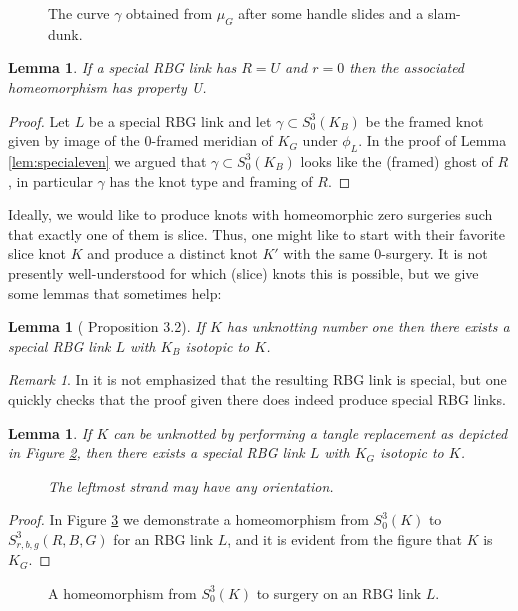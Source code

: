 \documentclass [11pt]{amsart}
\newtheorem {lemma}[theorem]{Lemma}
\theoremstyle{remark}
\newtheorem {remark}[theorem]{Remark}
\begin{document}
\begin{figure}
{
   \fontsize{9pt}{11pt}\selectfont
   \def\svgwidth{5in}
   
}
\caption{The curve $\gamma$ obtained from $\mu_G$ after some handle slides and a slam-dunk.}\label{fig:gamma} 
\end{figure}


\begin{lemma}\label{lem:specialpropU}
If a special RBG link has $R=U$ and $r=0$ then the associated homeomorphism has property U.
\end{lemma}
\begin{proof}
Let $L$ be a special RBG link and let $\gamma\subset S^3_0(K_B)$ be the framed knot given by image of the 0-framed meridian of $K_G$ under $\phi_L$. In the proof of Lemma \ref{lem:specialeven} we argued that  $\gamma\subset S^3_0(K_B)$ looks like the (framed) ghost of $R$, in particular $\gamma$ has the knot type and framing of $R$.
\end{proof}

Ideally, we would like to produce knots with homeomorphic zero surgeries such that exactly one of them is slice. Thus, one might like to start with their favorite slice knot $K$ and produce a distinct knot $K'$ with the same 0-surgery. It is not presently well-understood for which (slice) knots this is possible, but we give some lemmas that  sometimes help:

\begin{lemma}[\cite{Pic2} Proposition 3.2]
If $K$ has unknotting number one then there exists a special RBG link $L$ with $K_B$ isotopic to $K$.
\end{lemma}

\begin{remark}
In \cite{Pic2} it is not emphasized that the resulting RBG link is special, but one quickly checks that the proof given there does indeed produce special RBG links.
\end{remark}



\begin{lemma}\label{lem:untwisting}
If $K$ can be unknotted by performing a tangle replacement as depicted in Figure \ref{fig:untwistingmove}, then there exists a special RBG link $L$ with $K_G$ isotopic to $K$. 

\begin{figure}
{
   \fontsize{9pt}{11pt}\selectfont
   \def\svgwidth{2.5in}
   
}
\caption{The leftmost strand may have any orientation.}\label{fig:untwistingmove} 
\end{figure}


\end{lemma}
\begin{proof}
In Figure \ref{fig:untwisting} we demonstrate a homeomorphism from $S^3_0(K)$ to $S^3_{r,b,g}(R,B,G)$ for an RBG link $L$, and it is evident from the figure that $K$ is $K_G$. 
\end{proof}
\begin{figure}
{
   \fontsize{9pt}{11pt}\selectfont
   \def\svgwidth{4.9in}
   
}
\caption{A homeomorphism from $S^3_0(K)$ to surgery on an RBG link $L$.}\label{fig:untwisting}
\end{figure}
\end{document}
